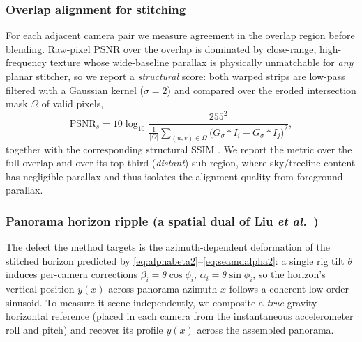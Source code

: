 \documentclass[journal]{IEEEtran}
\newcommand{\etal}{\textit{et al.}}
\begin{document}
\subsubsection{Overlap alignment for stitching}
For each adjacent camera pair we measure agreement in the overlap region before blending. Raw-pixel PSNR over the overlap is dominated by close-range, high-frequency texture whose wide-baseline parallax is physically unmatchable for \emph{any} planar stitcher, so we report a \emph{structural} score: both warped strips are low-pass filtered with a Gaussian kernel ($\sigma=2$) and compared over the eroded intersection mask $\Omega$ of valid pixels,
\begin{equation}
\mathrm{PSNR}_s = 10\log_{10}\!\frac{255^2}{\frac{1}{|\Omega|}\sum_{(u,v)\in\Omega}\!\big(G_\sigma{*}I_i - G_\sigma{*}I_j\big)^2},
\label{eq:strpsnr}
\end{equation}
together with the corresponding structural SSIM \cite{wang2004ssim}. We report the metric over the full overlap and over its top-third (\emph{distant}) sub-region, where sky/treeline content has negligible parallax and thus isolates the alignment quality from foreground parallax.

\subsubsection{Panorama horizon ripple (a spatial dual of Liu \etal\ \cite{liu2013bundled})}
The defect the method targets is the azimuth-dependent deformation of the stitched horizon predicted by \eqref{eq:alphabeta2}--\eqref{eq:seamdalpha2}: a single rig tilt $\theta$ induces per-camera corrections $\beta_i=\theta\cos\phi_i$, $\alpha_i=\theta\sin\phi_i$, so the horizon's vertical position $y(x)$ across panorama azimuth $x$ follows a coherent low-order sinusoid. To measure it scene-independently, we composite a \emph{true} gravity-horizontal reference (placed in each camera from the instantaneous accelerometer roll and pitch) and recover its profile $y(x)$ across the assembled panorama.
\end{document}
